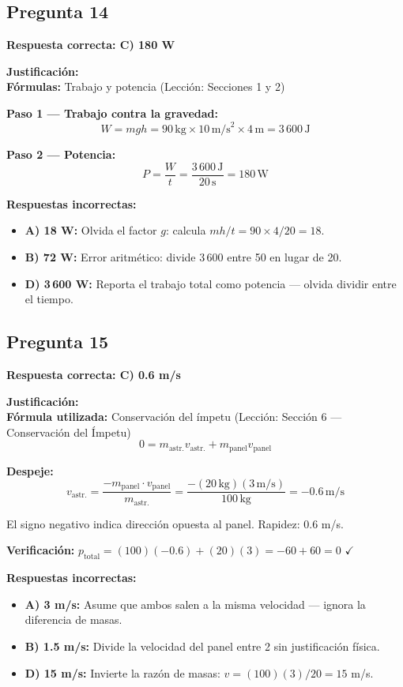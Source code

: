 \begin{respuestabox}
\subsection{Pregunta 14}
\textcolor{verdecorrecto}{\textbf{Respuesta correcta: C) 180 W}}

\textbf{Justificación:}\\
\textbf{Fórmulas:} Trabajo y potencia (Lección: Secciones 1 y 2)

\textbf{Paso 1 --- Trabajo contra la gravedad:}
$$W = mgh = 90\,\text{kg} \times 10\,\text{m/s}^2 \times 4\,\text{m} = 3\,600\,\text{J}$$

\textbf{Paso 2 --- Potencia:}
$$P = \frac{W}{t} = \frac{3\,600\,\text{J}}{20\,\text{s}} = 180\,\text{W}$$

\textbf{Respuestas incorrectas:}
\begin{itemize}
    \item \textbf{A) 18 W:} Olvida el factor $g$: calcula $mh/t = 90 \times 4 / 20 = 18$.
    \item \textbf{B) 72 W:} Error aritmético: divide $3\,600$ entre 50 en lugar de 20.
    \item \textbf{D) 3\,600 W:} Reporta el trabajo total como potencia --- olvida dividir entre el tiempo.
\end{itemize}
\end{respuestabox}

\begin{respuestabox}
\subsection{Pregunta 15}
\textcolor{verdecorrecto}{\textbf{Respuesta correcta: C) 0.6 m/s}}

\textbf{Justificación:}\\
\textbf{Fórmula utilizada:} Conservación del ímpetu (Lección: Sección 6 --- Conservación del Ímpetu)
$$0 = m_{\text{astr.}} v_{\text{astr.}} + m_{\text{panel}} v_{\text{panel}}$$

\textbf{Despeje:}
$$v_{\text{astr.}} = \frac{-m_{\text{panel}} \cdot v_{\text{panel}}}{m_{\text{astr.}}} = \frac{-(20\,\text{kg})(3\,\text{m/s})}{100\,\text{kg}} = -0.6\,\text{m/s}$$

El signo negativo indica dirección opuesta al panel. Rapidez: 0.6 m/s.

\textbf{Verificación:} $p_{\text{total}} = (100)(-0.6) + (20)(3) = -60 + 60 = 0$ $\checkmark$

\textbf{Respuestas incorrectas:}
\begin{itemize}
    \item \textbf{A) 3 m/s:} Asume que ambos salen a la misma velocidad --- ignora la diferencia de masas.
    \item \textbf{B) 1.5 m/s:} Divide la velocidad del panel entre 2 sin justificación física.
    \item \textbf{D) 15 m/s:} Invierte la razón de masas: $v = (100)(3)/20 = 15$ m/s.
\end{itemize}
\end{respuestabox}
